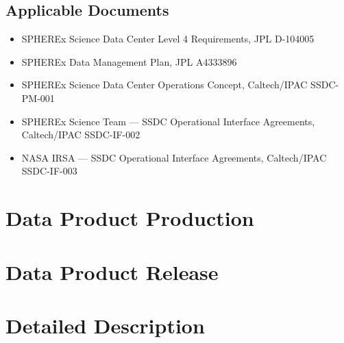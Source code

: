 \documentclass[DP]{spherex}
\begin{document}
\subsection{Applicable Documents}


\begin{itemize}
  \item SPHEREx Science Data Center Level 4 Requirements, JPL D-104005
  \item SPHEREx Data Management Plan, JPL A4333896
  \item SPHEREx Science Data Center Operations Concept, Caltech/IPAC SSDC-PM-001
  \item SPHEREx Science Team --- SSDC Operational Interface Agreements, Caltech/IPAC SSDC-IF-002
  \item NASA IRSA --- SSDC Operational Interface Agreements, Caltech/IPAC SSDC-IF-003
\end{itemize}


\section{Data Product Production}



\section{Data Product Release}



\section{Detailed Description}


% 
\end{document}
